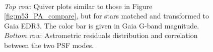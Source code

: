 \documentclass[]{spie}  %
\begin{document}
\begin{figure}[!h]
  \centering
  \\
  \hspace{-1cm}
  \caption{\textit{Top row}: Quiver plots similar to those in Figure \ref{fig:m53_PA_compare}, but for stars matched and transformed to Gaia EDR3. The color bar is given in Gaia G-band magnitude. \textit{Bottom row}: Astrometric residuals distribution and correlation between the two PSF modes.} \label{fig:m53_PA_compare_gaia}
\end{figure}
\end{document}

